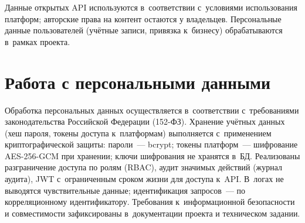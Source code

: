 Данные открытых API используются в~соответствии с~условиями использования платформ; авторские права на контент остаются у владельцев. Персональные данные пользователей (учётные записи, привязка к~бизнесу) обрабатываются в~рамках проекта.

\section{Работа с персональными данными}

Обработка персональных данных осуществляется в~соответствии с~требованиями законодательства Российской Федерации (152-ФЗ). Хранение учётных данных (хеш пароля, токены доступа к~платформам) выполняется с~применением криптографической защиты: пароли~--- bcrypt; токены платформ~--- шифрование AES-256-GCM при хранении; ключи шифрования не хранятся в~БД. Реализованы разграничение доступа по ролям (RBAC), аудит значимых действий (журнал аудита), JWT с~ограниченным сроком жизни для доступа к~API. В~логах не выводятся чувствительные данные; идентификация запросов~--- по корреляционному идентификатору. Требования к~информационной безопасности и совместимости зафиксированы в~документации проекта и техническом задании.
